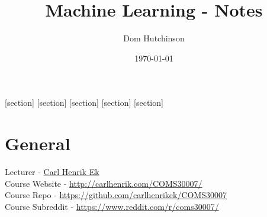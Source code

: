 \documentclass[11pt,a4paper]{article}
\begin{document}
\pagestyle{fancy}
\setlength\parindent{0pt}
\allowdisplaybreaks

\renewcommand{\headrulewidth}{0pt}

\title{Machine Learning - Notes}
\author{Dom Hutchinson}
\date{\today}
\maketitle

\fancyhead[R]{\today}

[section]
[section]
[section]
[section]
[section]

\newcommand{\dotprod}[0]{\boldsymbol{\cdot}}
\newcommand{\cosech}[0]{\mathrm{cosech}\ }
\newcommand{\cosec}[0]{\mathrm{cosec}\ }
\newcommand{\sech}[0]{\mathrm{sech}\ }
\newcommand{\blocks}[0]{\mathbb{B}}
\newcommand{\nats}[0]{\mathbb{N}}
\newcommand{\real}[0]{\mathbb{R}}
\newcommand{\eg}[0]{\textit{e.g.} }
\newcommand{\ie}[0]{\textit{i.e.} }
\newcommand{\integers}[0]{\mathbb{Z}}
\newcommand{\nb}[0]{\textit{N.B.} }
\newcommand{\prob}[0]{\mathbb{P}}
\newcommand{\expect}[0]{\mathbb{E}}
\newcommand{\var}[0]{\mathrm{var}}
\newcommand{\cov}[0]{\mathrm{cov}}

\newcommand{\definition}[1]{\stepcounter{definition} \textbf{Definition \arabic{section}.\arabic{definition}\ - }\textit{#1}\\}
\newcommand{\example}[1]{\stepcounter{example} \textbf{Example \arabic{section}.\arabic{example}\ - }\textit{#1}\\}
\newcommand{\notation}[1]{\stepcounter{notation} \textbf{Notation \arabic{section}.\arabic{notation}\ - }\textit{#1}\\}
\newcommand{\remark}[1]{\stepcounter{remark} \textbf{Remark \arabic{section}.\arabic{remark}\ - }\textit{#1}\\}
\newcommand{\theorem}[1]{\stepcounter{theorem} \textbf{Theorem \arabic{section}.\arabic{theorem}\ - }\textit{#1}\\}

\tableofcontents
\section*{General}
Lecturer - \href{carlhenrik.ek@bristol.ac.uk}{Carl Henrik Ek}\\
Course Website - \url{http://carlhenrik.com/COMS30007/}\\
Course Repo - \url{https://github.com/carlhenrikek/COMS30007}\\
Course Subreddit - \url{https://www.reddit.com/r/coms30007/}
\end{document}
